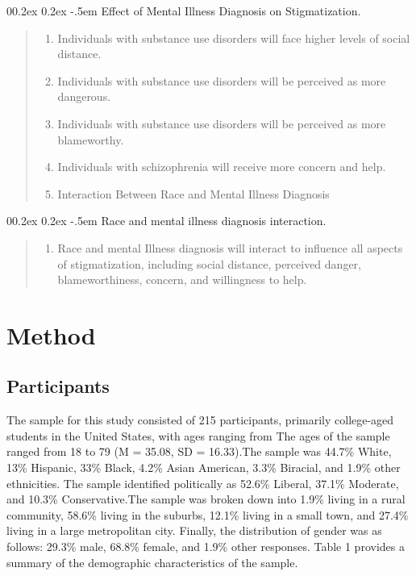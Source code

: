 \documentclass[
  man,
  floatsintext,
  longtable,
  nolmodern,
  notxfonts,
  notimes,
  colorlinks=true,linkcolor=blue,citecolor=blue,urlcolor=blue]{apa7}
\makeatletter
\renewcommand{\paragraph}{\@startsection{paragraph}{4}{\parindent}%
	{0\baselineskip \@plus 0.2ex \@minus 0.2ex}%
	{-.5em}%
	{\normalfont\normalsize\bfseries\typesectitle}}
\providecommand{\tightlist}{%
  \setlength{\itemsep}{0pt}\setlength{\parskip}{0pt}}
\makeatother
\begin{document}
\paragraph{Effect of Mental Illness Diagnosis on
Stigmatization.}\label{effect-of-mental-illness-diagnosis-on-stigmatization}

\begin{quote}
\begin{enumerate}
\def\labelenumi{\arabic{enumi}.}
\tightlist
\item
  Individuals with substance use disorders will face higher levels of
  social distance.
\item
  Individuals with substance use disorders will be perceived as more
  dangerous.
\item
  Individuals with substance use disorders will be perceived as more
  blameworthy.
\item
  Individuals with schizophrenia will receive more concern and help.
\item
  Interaction Between Race and Mental Illness Diagnosis
\end{enumerate}
\end{quote}

\paragraph{Race and mental illness diagnosis
interaction.}\label{race-and-mental-illness-diagnosis-interaction}

\begin{quote}
\begin{enumerate}
\def\labelenumi{\arabic{enumi}.}
\tightlist
\item
  Race and mental Illness diagnosis will interact to influence all
  aspects of stigmatization, including social distance, perceived
  danger, blameworthiness, concern, and willingness to help.
\end{enumerate}
\end{quote}

\section{Method}\label{method}

\subsection{Participants}\label{participants}

The sample for this study consisted of 215 participants, primarily
college-aged students in the United States, with ages ranging from The
ages of the sample ranged from 18 to 79 (M = 35.08, SD = 16.33).The
sample was 44.7\% White, 13\% Hispanic, 33\% Black, 4.2\% Asian
American, 3.3\% Biracial, and 1.9\% other ethnicities. The sample
identified politically as 52.6\% Liberal, 37.1\% Moderate, and 10.3\%
Conservative.The sample was broken down into 1.9\% living in a rural
community, 58.6\% living in the suburbs, 12.1\% living in a small town,
and 27.4\% living in a large metropolitan city. Finally, the
distribution of gender was as follows: 29.3\% male, 68.8\% female, and
1.9\% other responses. Table 1 provides a summary of the demographic
characteristics of the sample.
\end{document}
